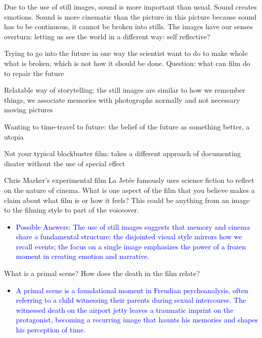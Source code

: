 \documentclass[11pt,fleqn]{book} %
\begin{document}
\begin{remark}
    Due to the use of still images, sound is more important than usual. Sound creates emotions. Sound is more cinematic than the picture in this picture because sound has to be continuous, it cannot be broken into stills. The images have our senses overturn: letting us see the world in a different way: self reflective? 
\end{remark}
\begin{remark}
    Trying to go into the future in one way the scientist want to do to make whole what is broken, which is not how it should be done. Question: what can film do to repair the future
\end{remark}
\begin{remark}
    Relatable way of storytelling: the still images are similar to how we remember things, we associate memories with photographs normally and not necessary moving pictures
\end{remark}
\begin{remark}
    Wanting to time-travel to future: the belief of the future as something better, a utopia 
\end{remark}
\begin{remark}
    Not your typical blockbuster film: takes a different approach of documenting disater without the use of special effect
\end{remark}
\begin{exercise}
Chris Marker's experimental film La Jetée famously uses science fiction to reflect on the nature of cinema. What is one aspect of the film that you believe makes a claim about what film is or how it feels? This could be anything from an image to the filming style to part of the voiceover.
\begin{itemize}
\item \textcolor{blue}{Possible Answers: The use of still images suggests that memory and cinema share a fundamental structure; the disjointed visual style mirrors how we recall events; the focus on a single image emphasizes the power of a frozen moment in creating emotion and narrative.}
\end{itemize}
\end{exercise}

\begin{exercise}
What is a primal scene? How does the death in the film relate?
\begin{itemize}
\item \textcolor{blue}{A primal scene is a foundational moment in Freudian psychoanalysis, often referring to a child witnessing their parents during sexual intercourse. The witnessed death on the airport jetty leaves a traumatic imprint on the protagonist, becoming a recurring image that haunts his memories and shapes his perception of time.}
\end{itemize}
\end{exercise}
\end{document}
